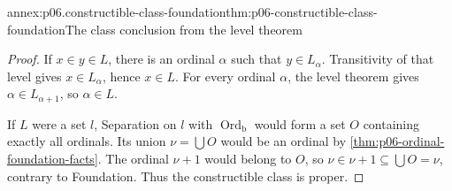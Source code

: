 \begin{annexitem}{annex:p06.constructible-class-foundation}{thm:p06-constructible-class-foundation}{The class conclusion from the level theorem}
\begin{proof}
If \(x\in y\in L\), there is an ordinal \(\alpha\) such that
\(y\in L_\alpha\).  Transitivity of that level gives
\(x\in L_\alpha\), hence \(x\in L\).  For every ordinal
\(\alpha\), the level theorem gives
\(\alpha\in L_{\alpha+1}\), so \(\alpha\in L\).

If \(L\) were a set \(l\), Separation on \(l\) with
\(\operatorname{Ord}_{\mathrm b}\) would form a set \(O\)
containing exactly all ordinals.  Its union \(\nu=\bigcup O\)
would be an ordinal by \cref{thm:p06-ordinal-foundation-facts}.
The ordinal \(\nu+1\) would belong to \(O\), so
\(\nu\in\nu+1\subseteq\bigcup O=\nu\), contrary to Foundation.
Thus the constructible class is proper.
\end{proof}
\end{annexitem}
